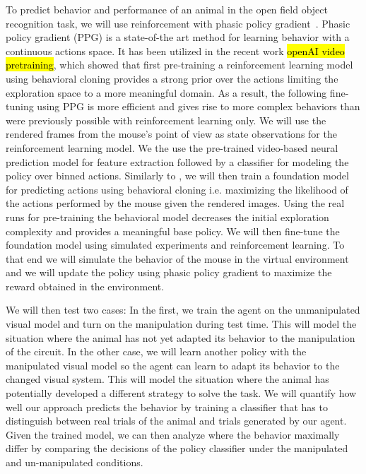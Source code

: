 \documentclass[B2,COG]{ercgrant}
\begin{document}
To predict behavior and performance of an animal in the open field object recognition task, we will use reinforcement with phasic policy gradient~\parencite[PPG,][]{Cobbe2021-op}. 
Phasic policy gradient (PPG) is a state-of-the art method for learning behavior with a continuous actions space. 
It has been utilized in the recent work \hl{openAI video pretraining}, which showed that first pre-training a reinforcement learning model using behavioral cloning provides a strong prior over the actions limiting the exploration space to a more meaningful domain. 
As a result, the following fine-tuning using PPG is more efficient and gives rise to more complex behaviors than were previously possible with reinforcement learning only.
We will use the rendered frames from the mouse's point of view as state observations for the reinforcement learning model. 
We the use the pre-trained video-based neural prediction model for feature extraction followed by a classifier for modeling the policy over binned actions.
Similarly to \cite{Baker2022-ph}, we will then train a foundation model for predicting actions using behavioral cloning i.e. maximizing the likelihood of the actions performed by the mouse given the rendered images.
Using the real runs for pre-training the behavioral model decreases the initial exploration complexity and provides a meaningful base policy.
We will then fine-tune the foundation model using simulated experiments and reinforcement learning. 
To that end we will simulate the behavior of the mouse in the virtual environment and we will update the policy using phasic policy gradient \parencite{Cobbe2021-op} to maximize the reward obtained in the environment.

We will then test two cases: In the first, we train the agent on the unmanipulated visual model and turn on the manipulation during test time. 
This will model the situation where the animal has not yet adapted its behavior to the manipulation of the circuit. 
In the other case, we will learn another policy with the manipulated visual model so the agent can learn to adapt its behavior to the changed visual system. 
This will model the situation where the animal has potentially developed a different strategy to solve the task. 
We will quantify how well our approach predicts the behavior by training a classifier that has to distinguish between real trials of the animal and trials generated by our agent. 
Given the trained model, we can then analyze where the behavior maximally differ by comparing the decisions of the policy classifier under the manipulated and un-manipulated conditions. 
\end{document}
